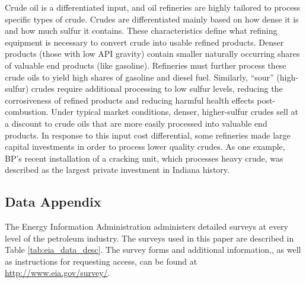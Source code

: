 \documentclass[12pt]{article}
\begin{document}
Crude oil is a differentiated input, and oil refineries are highly tailored to process specific types of crude. Crudes are differentiated mainly based on how dense it is and how much sulfur it contains. These characteristics define what refining equipment is necessary to convert crude into usable refined products. Denser products (those with low API gravity) contain smaller naturally occurring shares of valuable end products (like gasoline). Refineries must further process these crude oils to yield high shares of gasoline and diesel fuel. Similarly, ``sour'' (high-sulfur) crudes require additional processing to low sulfur levels, reducing the corrosiveness of refined products and reducing harmful health effects post-combustion. Under typical market conditions, denser, higher-sulfur crudes sell at a discount to crude oils that are more easily processed into valuable end products. In response to this input cost differential, some refineries made large capital investments in order to process lower quality crudes. As one example, BP's recent installation of a cracking unit, which processes heavy crude, was described as the largest private investment in Indiana history.


\subsection{Data Appendix \label{App:Data}}
The Energy Information Administration administers detailed surveys at every level of the petroleum industry. The surveys used in this paper are described in Table \ref{tab:eia_data_desc}. The survey forms and additional information,, as well as instructions for requesting access, can be found at \href{http://www.eia.gov/survey/}{http://www.eia.gov/survey/}.
\end{document}
